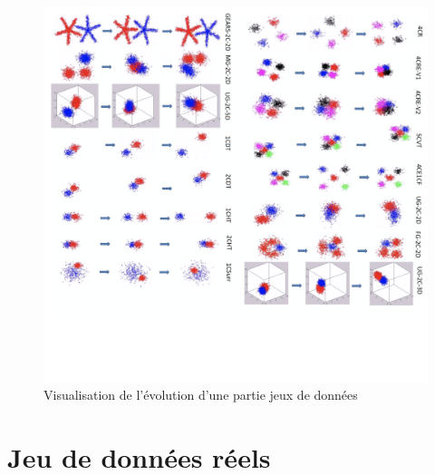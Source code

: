 \documentclass[11pt,a4paper]{report}
\begin{document}
\begin{figure}[h]
    \centering
    \includegraphics[width=\textwidth]{datasets_synthetiques}
    \caption{Visualisation de l'évolution d'une partie jeux de données}
\end{figure}



\chapter*{Jeu de données réels}
\end{document}
